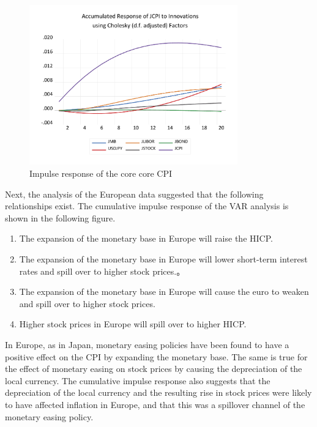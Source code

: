 \documentclass[12pt]{article}
\begin{document}
\begin{figure}[!htbp]
\begin{minipage}{0.5\hsize}
\begin{center}
        \end{center}
    \end{minipage}
    \begin{minipage}{0.5\hsize}
        \caption{Impulse response of the core core CPI}
        \begin{center}
            \includegraphics[width=9cm]{ijcpi.pdf}
        \end{center}
    \end{minipage}
\end{figure}

\newpage

Next, the analysis of the European data suggested that the following relationships exist.
The cumulative impulse response of the VAR analysis is shown in the following figure.

\begin{enumerate}
    \setlength{\leftskip}{30pt}
    \item The expansion of the monetary base in Europe will raise the HICP.
    \item The expansion of the monetary base in Europe will lower short-term interest rates and spill over to higher stock prices.。
    \item The expansion of the monetary base in Europe will cause the euro to weaken and spill over to higher stock prices.
    \item Higher stock prices in Europe will spill over to higher HICP.
\end{enumerate}

In Europe, as in Japan, monetary easing policies have been found to have a positive effect on the CPI by expanding the monetary base.
The same is true for the effect of monetary easing on stock prices by causing the depreciation of the local currency.
The cumulative impulse response also suggests that the depreciation of the local currency and the resulting rise in stock prices were likely to have affected inflation in Europe, and that this was a spillover channel of the monetary easing policy.
\end{document}
